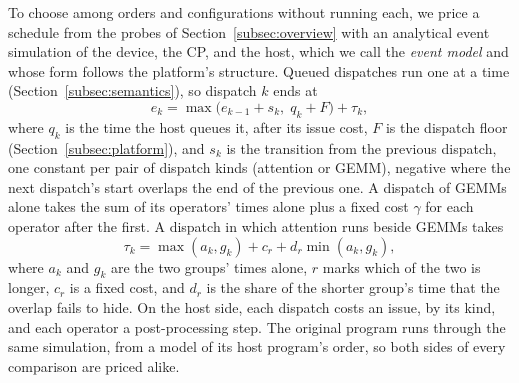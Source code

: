 To choose among orders and configurations without running each, we price a schedule from the probes of Section~\ref{subsec:overview} with an analytical event simulation of the device, the CP, and the host, which we call the \emph{event model} and whose form follows the platform's structure.
Queued dispatches run one at a time (Section~\ref{subsec:semantics}), so dispatch $k$ ends at
\begin{equation}
\label{eq:cmd}
e_k = \max\bigl(e_{k-1} + s_k,\; q_k + F\bigr) + \tau_k,
\end{equation}
where $q_k$ is the time the host queues it, after its issue cost, $F$ is the dispatch floor (Section~\ref{subsec:platform}), and $s_k$ is the transition from the previous dispatch, one constant per pair of dispatch kinds (attention or GEMM), negative where the next dispatch's start overlaps the end of the previous one.
A dispatch of GEMMs alone takes the sum of its operators' times alone plus a fixed cost $\gamma$ for each operator after the first.
A dispatch in which attention runs beside GEMMs takes
\begin{equation}
\label{eq:overlap}
\tau_k = \max(a_k, g_k) + c_r + d_r \min(a_k, g_k),
\end{equation}
where $a_k$ and $g_k$ are the two groups' times alone, $r$ marks which of the two is longer, $c_r$ is a fixed cost, and $d_r$ is the share of the shorter group's time that the overlap fails to hide.
On the host side, each dispatch costs an issue, by its kind, and each operator a post-processing step.
The original program runs through the same simulation, from a model of its host program's order, so both sides of every comparison are priced alike.
